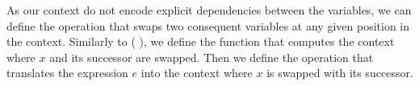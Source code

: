 As our context do not encode explicit dependencies between the variables,
we can define the operation that swaps two consequent variables at any given
position in the context.  Similarly to ( \AF{/} ), we define the
function  that computes the context where $x$ and its successor are
swapped.  Then we define the operation  that translates the expression
$e$ into the context where $x$ is swapped with its successor.
\begin{code}%
%
\>[2]\AgdaSpace{}%
\AgdaSymbol{:}\AgdaSpace{}%
\AgdaSymbol{(}\AgdaSpace{}%
\AgdaSymbol{:}\AgdaSpace{}%
\AgdaSymbol{)}\AgdaSpace{}%
\AgdaSpace{}%
\AgdaSpace{}%
\AgdaSpace{}%
\AgdaSpace{}%
\AgdaSpace{}%
\<%
\\
%
\>[2]\AgdaSpace{}%
\AgdaSymbol{(}\AgdaSpace{}%
\AgdaSpace{}%
\AgdaSymbol{)}%
\>[24]%
\>[37]\AgdaSymbol{=}\AgdaSpace{}%
\AgdaSpace{}%
\AgdaSpace{}%
\<%
\\
%
\>[2]\AgdaSpace{}%
\AgdaSymbol{(}\AgdaSpace{}%
\AgdaSpace{}%
\AgdaSpace{}%
\AgdaSpace{}%
\AgdaSymbol{)}%
\>[24]%
\>[37]\AgdaSymbol{=}\AgdaSpace{}%
\AgdaSpace{}%
\AgdaSpace{}%
\AgdaSpace{}%
\AgdaSpace{}%
\<%
\\
%
\>[2]\AgdaSpace{}%
\AgdaSymbol{(}\AgdaSpace{}%
\AgdaSpace{}%
\AgdaSpace{}%
\AgdaSpace{}%
\AgdaSymbol{)}%
\>[24]\AgdaSymbol{(}\AgdaSpace{}%
\AgdaSymbol{(}\AgdaSpace{}%
\AgdaSymbol{))}%
\>[37]\AgdaSymbol{=}\AgdaSpace{}%
\AgdaSpace{}%
\AgdaSymbol{(}\AgdaSpace{}%
\AgdaSpace{}%
\AgdaSymbol{)}\AgdaSpace{}%
\AgdaSymbol{(}\AgdaSpace{}%
\AgdaSymbol{)}\AgdaSpace{}%
\AgdaSpace{}%

\end{code}
